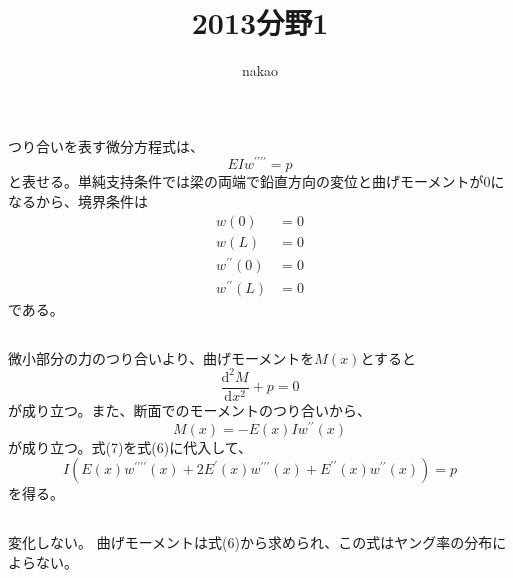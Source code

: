 \documentclass[a4paper]{jsarticle}
\begin{document}
\title{2013分野1}
\author{nakao}
\maketitle

\section{}
\subsection{}
つり合いを表す微分方程式は、
\begin{equation}
  E I w^{\prime \prime \prime \prime} = p
\end{equation}
と表せる。単純支持条件では梁の両端で鉛直方向の変位と曲げモーメントが0になるから、境界条件は
\begin{align}
  w(0) &= 0 \\
  w(L) &= 0 \\
  w^{\prime \prime}(0) &= 0 \\
  w^{\prime \prime}(L) &= 0
\end{align}
である。

\subsection{}
微小部分の力のつり合いより、曲げモーメントを$M(x)$とすると
\begin{equation}
  \frac{\mathrm{d}^2 M}{\mathrm{d} x^2} + p = 0
\end{equation}
が成り立つ。また、断面でのモーメントのつり合いから、
\begin{equation}
  M(x) = -E(x) I w^{\prime \prime}(x)
\end{equation}
が成り立つ。式(7)を式(6)に代入して、
\begin{equation}
  I \left(E(x) w^{\prime \prime \prime \prime}(x) + 
  2 E^{\prime}(x) w^{\prime \prime \prime}(x) + 
  E^{\prime \prime}(x) w^{\prime \prime}(x)\right)
  = p
\end{equation}
を得る。

\subsection{}
変化しない。
曲げモーメントは式(6)から求められ、この式はヤング率の分布によらない。
\end{document}
